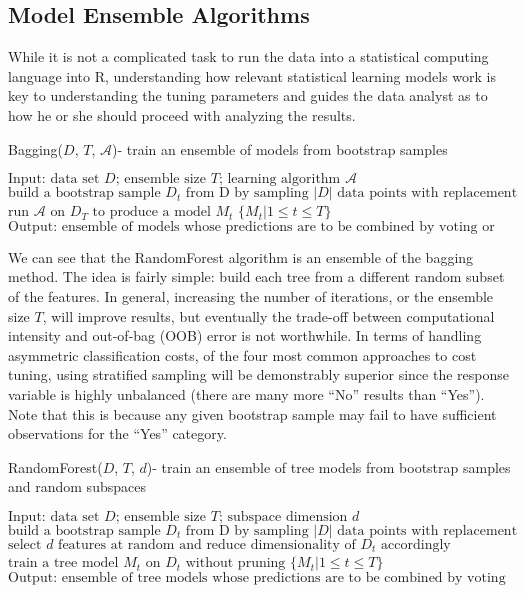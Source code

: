 \documentclass{article}
\begin{document}
\subsection{Model Ensemble Algorithms}
While it is not a complicated task to run the data into a statistical computing language into R, understanding how relevant statistical learning models work is key to understanding the tuning parameters and guides the data analyst as to how he or she should proceed with analyzing the results.
\begin{algorithm}
\caption{Bagging($D$, $T$, $\mathcal{A}$)- train an ensemble of models from bootstrap samples}\label{bagging}
\begin{algorithmic}[1]
\State $\text{Input: data set $D$; ensemble size $T$; learning algorithm $\mathcal{A}$}$
\State $\text{build a bootstrap sample $D_t$ from D by sampling $|D|$ data points with replacement}$
\State $\text{run $\mathcal{A}$ on $D_T$ to produce a model $M_t$}$
\EndFor
\State \Return $\{M_t | 1 \leq t \leq T\}$
\State $\text{Output: ensemble of models whose predictions are to be combined by voting or averaging}$
\EndProcedure
\end{algorithmic}
\end{algorithm}

We can see that the RandomForest algorithm is an ensemble of the bagging method. The idea is fairly simple: build each tree from a different random subset of the features. In general, increasing the number of iterations, or the ensemble size $T$, will improve results, but eventually the trade-off between computational intensity and out-of-bag (OOB) error is not worthwhile. In terms of handling asymmetric classification costs, of the four most common approaches to cost tuning, using stratified sampling will be demonstrably superior since the response variable is highly unbalanced (there are many more ``No'' results than ``Yes''). Note that this is because any given bootstrap sample may fail to have sufficient observations for the ``Yes'' category. 


\begin{algorithm}[!htb]
\caption{RandomForest($D$, $T$, $d$)- train an ensemble of tree models from bootstrap samples and random subspaces}\label{RandomForest}
\begin{algorithmic}[1]
\State $\text{Input: data set $D$; ensemble size $T$; subspace dimension $d$}$
\State $\text{build a bootstrap sample $D_t$ from D by sampling $|D|$ data points with replacement}$
\State $\text{select $d$ features at random and reduce dimensionality of $D_t$ accordingly}$
\State $\text{train a tree model $M_t$ on $D_t$ without pruning}$
\EndFor
\State \Return $\{M_t | 1 \leq t \leq T\}$
\State $\text{Output: ensemble of tree models whose predictions are to be combined by voting or averaging}$
\EndProcedure
\end{algorithmic}
\end{algorithm}
\end{document}
